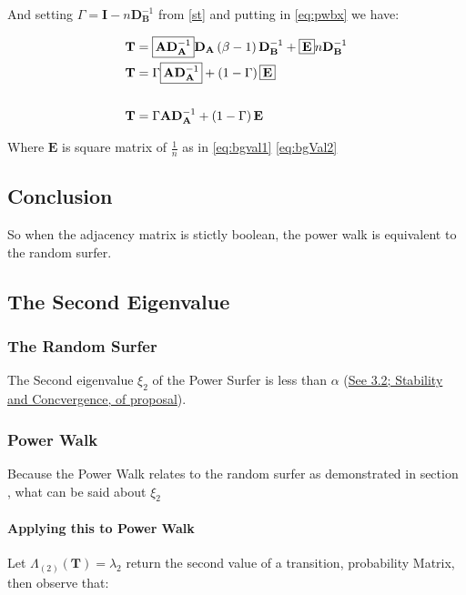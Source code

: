 \documentclass[11pt]{article}
\begin{document}
And setting \(\Gamma = \mathbf{I}- n \mathbf{D}_{\mathbf{B}}^{- 1}\)  from \eqref{st} and putting in \eqref{eq:pwbx} we have:

\begin{align}
\mathbf{T} &= \text{\fboxsep=.2em\fbox{$\mathbf{A}\mathbf{D}_{\mathbf{A}}^{- 1}$}}  \mathbf{D}_{\mathbf{A}} \left( \beta - 1 \right) \mathbf{D}_{\mathbf{B}}^{- 1} + \text{\fboxsep=.2em\fbox{$\mathbf{E}$}} n \mathbf{D}_{\mathbf{B}}^{- 1}  \nonumber \\
  \mathbf{T} &= \Gamma \text{\fboxsep=.2em\fbox{$\mathbf{A}\mathbf{D}_{\mathbf{A}}^{- 1}$}}  + \left( 1-\Gamma \right) \text{\fboxsep=.2em\fbox{$\mathbf{E}$}} \nonumber \\
  \ \nonumber \\
  \mathbf{T} &= \Gamma \mathbf{A}\mathbf{D}_{\mathbf{A}}^{- 1}  + \left( 1-\Gamma \right) \mathbf{E}
  \end{align}

Where \(\mathbf{E}\) is square matrix of \(\frac{1}{n}\) as in \eqref{eq:bgval1}  \eqref{eq:bgVal2}

\subsection{Conclusion}
\label{sec:orgb6226ed}
So when the adjacency matrix is stictly boolean, the power walk is equivalent to the random surfer.

\subsection{The Second Eigenvalue}
\label{sec:org3d38cb6}
\subsubsection{The Random Surfer}
\label{sec:org59e64b3}
The Second eigenvalue \(\xi_2\) of the Power Surfer is less than \(\alpha\) (\href{Proposal/Propsal.org}{See 3.2; Stability and Concvergence, of proposal}).
\subsubsection{Power Walk}
\label{sec:orge7af8d3}
Because the Power Walk relates to the random surfer as demonstrated in section , what can be said about \(\xi_{2}\)
\paragraph{Applying this to Power Walk}
\label{sec:org23113bf}
Let \(\Lambda_{\left( 2 \right)}\left( \mathbf{T} \right) = \lambda_2\) return the second value of a transition, probability Matrix, then observe that:
\end{document}
